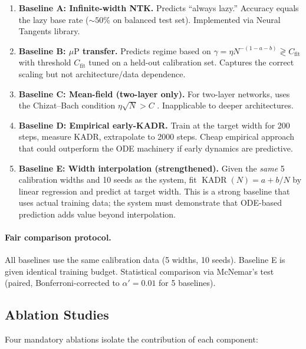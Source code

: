 \documentclass[11pt]{article}
\theoremstyle{definition}
\DeclareMathOperator{\KADR}{KADR}
\newcommand{\muP}{\mu\text{P}}
\begin{document}
\begin{enumerate}[leftmargin=*]
\item \textbf{Baseline A: Infinite-width NTK.} Predicts ``always lazy.'' Accuracy equals the lazy base rate ($\sim 50\%$ on balanced test set). Implemented via Neural Tangents library.

\item \textbf{Baseline B: $\muP$ transfer.} Predicts regime based on $\gamma = \eta N^{-(1-a-b)} \gtrless C_{\mathrm{fit}}$ with threshold $C_{\mathrm{fit}}$ tuned on a held-out calibration set. Captures the correct scaling but not architecture/data dependence.

\item \textbf{Baseline C: Mean-field (two-layer only).} For two-layer networks, uses the Chizat--Bach condition $\eta\sqrt{N} > C$ \citep{chizat2019lazy}. Inapplicable to deeper architectures.

\item \textbf{Baseline D: Empirical early-KADR.} Train at the target width for 200 steps, measure KADR, extrapolate to 2000 steps. Cheap empirical approach that could outperform the ODE machinery if early dynamics are predictive.

\item \textbf{Baseline E: Width interpolation (strengthened).} Given the \emph{same} 5 calibration widths and 10 seeds as the system, fit $\KADR(N) = a + b/N$ by linear regression and predict at target width. This is a strong baseline that uses actual training data; the system must demonstrate that ODE-based prediction adds value beyond interpolation.
\end{enumerate}

\paragraph{Fair comparison protocol.} All baselines use the same calibration data (5 widths, 10 seeds). Baseline E is given identical training budget. Statistical comparison via McNemar's test (paired, Bonferroni-corrected to $\alpha' = 0.01$ for 5 baselines).

\subsection{Ablation Studies}
\label{sec:ablations}

Four mandatory ablations isolate the contribution of each component:
\end{document}

